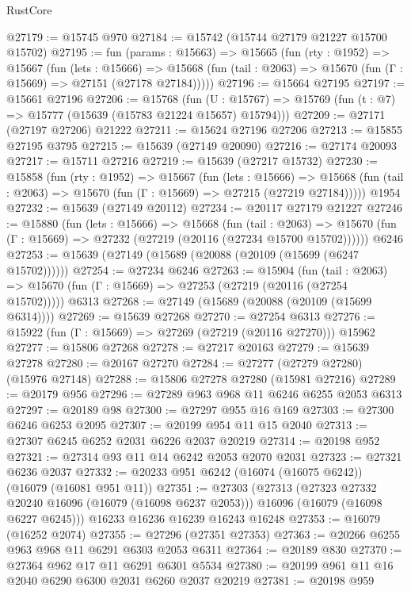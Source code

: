 \begin{lexlean}{RustCore}
\begin{coremodule}
@27179 := @15745 @970
@27184 := @15742 (@15744 @27179 @21227 @15700 @15702)
@27195 := fun (params : @15663) =>
  @15665
    (fun (rty : @1952) =>
    @15667
      (fun (lets : @15666) =>
      @15668 (fun (tail : @2063) => @15670 (fun (Γ : @15669) => @27151 (@27178 @27184)))))
@27196 := @15664 @27195
@27197 := @15661 @27196
@27206 := @15768
    (fun (U : @15767) => @15769 (fun (t : @7) => @15777 (@15639 (@15783 @21224 @15657) @15794)))
@27209 := @27171 (@27197 @27206) @21222
@27211 := @15624 @27196 @27206
@27213 := @15855 @27195 @3795
@27215 := @15639 (@27149 @20090)
@27216 := @27174 @20093
@27217 := @15711 @27216
@27219 := @15639 (@27217 @15732)
@27230 := @15858
    (fun (rty : @1952) =>
    @15667
      (fun (lets : @15666) =>
      @15668 (fun (tail : @2063) => @15670 (fun (Γ : @15669) => @27215 (@27219 @27184)))))
    @1954
@27232 := @15639 (@27149 @20112)
@27234 := @20117 @27179 @21227
@27246 := @15880
    (fun (lets : @15666) =>
    @15668
      (fun (tail : @2063) =>
      @15670 (fun (Γ : @15669) => @27232 (@27219 (@20116 (@27234 @15700 @15702))))))
    @6246
@27253 := @15639 (@27149 (@15689 (@20088 (@20109 (@15699 (@6247 @15702))))))
@27254 := @27234 @6246
@27263 := @15904
    (fun (tail : @2063) => @15670 (fun (Γ : @15669) => @27253 (@27219 (@20116 (@27254 @15702)))))
    @6313
@27268 := @27149 (@15689 (@20088 (@20109 (@15699 @6314))))
@27269 := @15639 @27268
@27270 := @27254 @6313
@27276 := @15922 (fun (Γ : @15669) => @27269 (@27219 (@20116 @27270))) @15962
@27277 := @15806 @27268
@27278 := @27217 @20163
@27279 := @15639 @27278
@27280 := @20167 @27270
@27284 := @27277 (@27279 @27280) (@15976 @27148)
@27288 := @15806 @27278 @27280 (@15981 @27216)
@27289 := @20179 @956
@27296 := @27289 @963 @968 @11 @6246 @6255 @2053 @6313
@27297 := @20189 @98
@27300 := @27297 @955 @16 @169
@27303 := @27300 @6246 @6253 @2095
@27307 := @20199 @954 @11 @15 @2040
@27313 := @27307 @6245 @6252 @2031 @6226 @2037 @20219
@27314 := @20198 @952
@27321 := @27314 @93 @11 @14 @6242 @2053 @2070 @2031
@27323 := @27321 @6236 @2037
@27332 := @20233 @951 @6242 (@16074 (@16075 @6242)) (@16079 (@16081 @951 @11))
@27351 := @27303
    (@27313
      (@27323 @27332 @20240 @16096 (@16079 (@16098 @6237 @2053)))
      @16096
      (@16079 (@16098 @6227 @6245)))
    @16233
    @16236
    @16239
    @16243
    @16248
@27353 := @16079 (@16252 @2074)
@27355 := @27296 (@27351 @27353)
@27363 := @20266 @6255 @963 @968 @11 @6291 @6303 @2053 @6311
@27364 := @20189 @830
@27370 := @27364 @962 @17 @11 @6291 @6301 @5534
@27380 := @20199 @961 @11 @16 @2040 @6290 @6300 @2031 @6260 @2037 @20219
@27381 := @20198 @959

\end{coremodule}
\end{lexlean}
